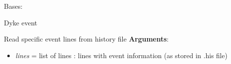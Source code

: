 \documentclass[a4paper,10pt,english]{sphinxmanual}
\begin{document}
\begin{fulllineitems}
\label{pynoddy:pynoddy.events.Dyke}
Bases: {\hyperref[pynoddy:pynoddy.events.Event]{\emph{}}}

Dyke event

\begin{fulllineitems}
\label{pynoddy:pynoddy.events.Dyke.parse_event_lines}
Read specific event lines from history file
\textbf{Arguments}:
\begin{itemize}
\item {} 
\emph{lines} = list of lines : lines with event information (as stored in .his file)

\end{itemize}

\end{fulllineitems}


\end{fulllineitems}

\end{document}
